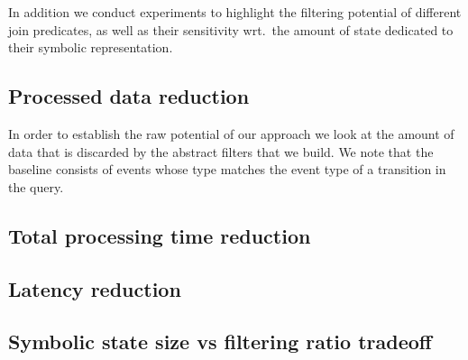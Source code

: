 In addition we conduct experiments to highlight the filtering potential of
different join predicates, as well as their sensitivity wrt.\ the amount of
state dedicated to their symbolic representation.



\subsection{Processed data reduction}

In order to establish the raw potential of our approach we look at the amount of
data that is discarded by the abstract filters that we build.
We note that the baseline consists of events whose type matches the event type
of a transition in the query.


\subsection{Total processing time reduction}


\subsection{Latency reduction}

\subsection{Symbolic state size vs filtering ratio tradeoff}